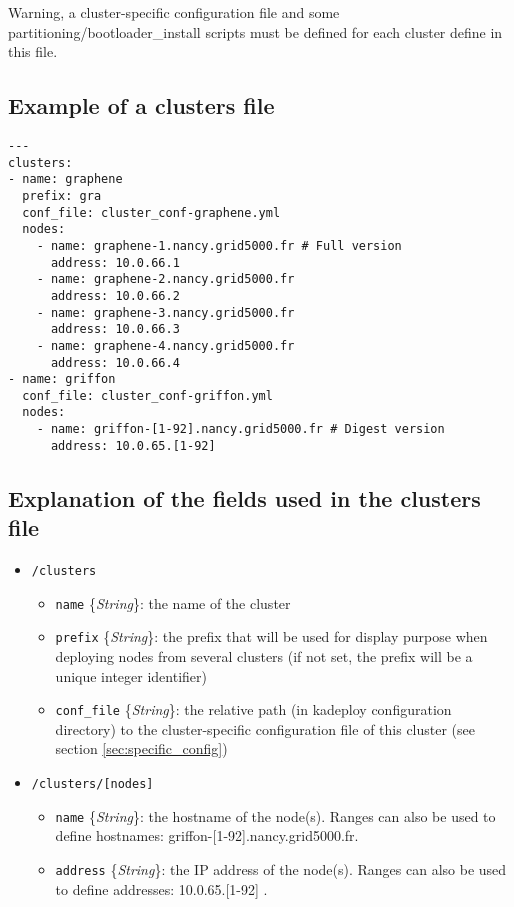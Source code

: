 \documentclass[a4wide,10pt,oneside]{book}
\newcommand{\ypath}[1]{\texttt{#1}}
\newcommand{\yfield}[2]{\texttt{#1} {\small\{{\emph{#2}}\}}:}
\begin{document}
Warning, a cluster-specific configuration file and some partitioning/bootloader\_install scripts must be defined for each cluster define in this file.

\subsection{Example of a clusters file\\}
\begin{small}
\begin{verbatim}
--- 
clusters:
- name: graphene
  prefix: gra
  conf_file: cluster_conf-graphene.yml
  nodes: 
    - name: graphene-1.nancy.grid5000.fr # Full version
      address: 10.0.66.1
    - name: graphene-2.nancy.grid5000.fr
      address: 10.0.66.2
    - name: graphene-3.nancy.grid5000.fr
      address: 10.0.66.3
    - name: graphene-4.nancy.grid5000.fr
      address: 10.0.66.4
- name: griffon
  conf_file: cluster_conf-griffon.yml
  nodes: 
    - name: griffon-[1-92].nancy.grid5000.fr # Digest version
      address: 10.0.65.[1-92]
\end{verbatim}
\end{small}

\subsection{Explanation of the fields used in the clusters file\\}
\begin{itemize}
  \item \ypath{/clusters}
  \begin{itemize}
    \item \yfield{name}{String} the name of the cluster
    \item \yfield{prefix}{String} the prefix that will be used for display purpose when deploying nodes from several clusters (if not set, the prefix will be a unique integer identifier)
    \item \yfield{conf\_file}{String} the relative path (in kadeploy configuration directory) to the cluster-specific configuration file of this cluster (see section \ref{sec:specific_config})
  \end{itemize}

  \item \ypath{/clusters/[nodes]}
  \begin{itemize}
    \item \yfield{name}{String} the hostname of the node(s). Ranges can also be used to define hostnames: griffon-[1-92].nancy.grid5000.fr.
    \item \yfield{address}{String} the IP address of the node(s). Ranges can also be used to define addresses: 10.0.65.[1-92] .
  \end{itemize}
\end{itemize}
\end{document}
